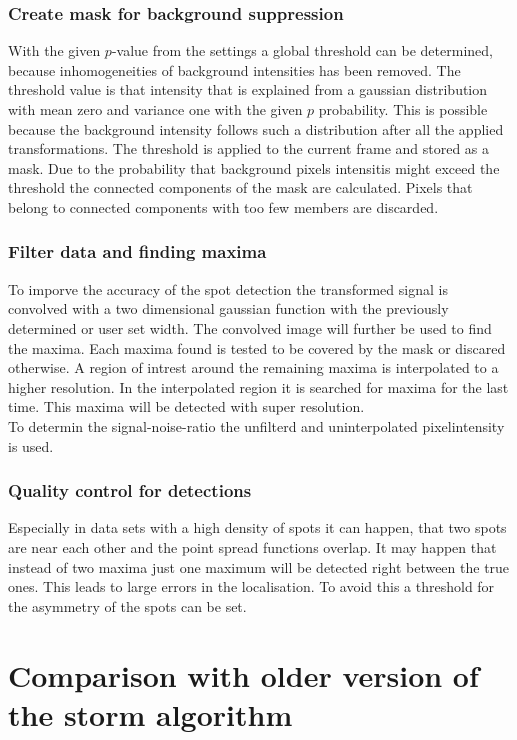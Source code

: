 \subsubsection{Create mask for background suppression}
With the given $p$-value from the settings a global threshold can be determined, because inhomogeneities of background intensities has been removed. The threshold value is that intensity that is explained from a gaussian distribution with mean zero and variance one with the given $p$ probability. This is possible because the background intensity follows such a distribution after all the applied transformations.\newline
The threshold is applied to the current frame and stored as a mask. Due to the probability that background pixels intensitis might exceed the threshold the connected components of the mask are calculated. Pixels that belong to connected components with too few members are discarded. 
\subsubsection{Filter data and finding maxima}
To imporve the accuracy of the spot detection the transformed signal is convolved with a two dimensional gaussian function with the previously determined or user set width. The convolved image will further be used to find the maxima. Each maxima found is tested to be covered by the mask or discared otherwise. A region of intrest around the remaining maxima is interpolated to a higher resolution. In the interpolated region  it is searched for maxima for the last time. This maxima will be detected with super resolution.\\
To determin the signal-noise-ratio the unfilterd and uninterpolated pixelintensity is used.

\subsubsection{Quality control for detections}
Especially in data sets with a high density of spots it can happen, that two spots are near each other and the point spread functions overlap. It may happen that instead of two maxima just one maximum will be detected right between the true ones. This leads to large errors in the localisation. To avoid this a threshold for the asymmetry of the spots can be set.


\section{Comparison with older version of the storm algorithm}
